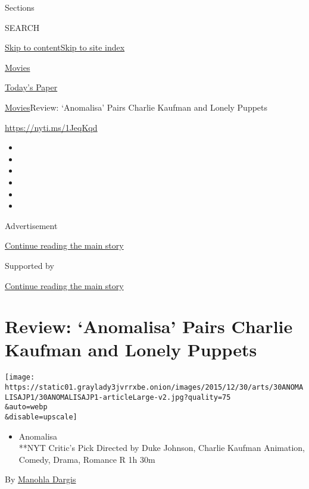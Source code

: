 Sections

SEARCH

\protect\hyperlink{site-content}{Skip to
content}\protect\hyperlink{site-index}{Skip to site index}

\href{https://www.nytimes3xbfgragh.onion/section/movies}{Movies}

\href{https://myaccount.nytimes3xbfgragh.onion/auth/login?response_type=cookie\&client_id=vi}{}

\href{https://www.nytimes3xbfgragh.onion/section/todayspaper}{Today's
Paper}

\href{/section/movies}{Movies}\textbar{}Review: `Anomalisa' Pairs
Charlie Kaufman and Lonely Puppets

\url{https://nyti.ms/1JeqKqd}

\begin{itemize}
\item
\item
\item
\item
\item
\item
\end{itemize}

Advertisement

\protect\hyperlink{after-top}{Continue reading the main story}

Supported by

\protect\hyperlink{after-sponsor}{Continue reading the main story}

\hypertarget{review-anomalisa-pairs-charlie-kaufman-and-lonely-puppets}{%
\section{Review: `Anomalisa' Pairs Charlie Kaufman and Lonely
Puppets}\label{review-anomalisa-pairs-charlie-kaufman-and-lonely-puppets}}

\texttt{[image: https://static01.graylady3jvrrxbe.onion/images/2015/12/30/arts/30ANOMALISAJP1/30ANOMALISAJP1-articleLarge-v2.jpg?quality=75\\\&auto=webp\\\&disable=upscale]}

\begin{itemize}
\tightlist
\item
  Anomalisa\\
  **NYT Critic's Pick Directed by Duke Johnson, Charlie Kaufman
  Animation, Comedy, Drama, Romance R 1h 30m
\end{itemize}

By \href{https://www.nytimes3xbfgragh.onion/by/manohla-dargis}{Manohla
Dargis}

